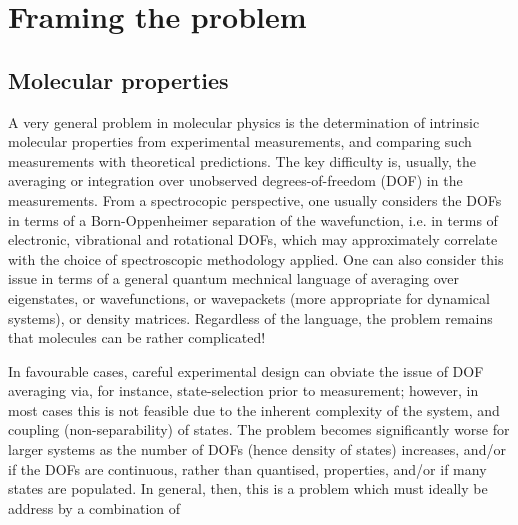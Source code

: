 \section{Framing the problem}

\subsection{Molecular properties}
A very general problem in molecular physics is the determination of intrinsic molecular properties from experimental measurements, and comparing such measurements with theoretical predictions. The key difficulty is, usually, the averaging or integration over unobserved degrees-of-freedom (DOF) in the measurements. From a spectrocopic perspective, one usually considers the DOFs in terms of a Born-Oppenheimer separation of the wavefunction, i.e. in terms of electronic, vibrational and rotational DOFs, which may approximately correlate with the choice of spectroscopic methodology applied. One can also consider this issue in terms of a general quantum mechnical language of averaging over eigenstates, or wavefunctions, or wavepackets (more appropriate for dynamical systems), or density matrices. Regardless of the language, the problem remains that molecules can be rather complicated!

In favourable cases, careful experimental design can obviate the issue of DOF averaging via, for instance, state-selection prior to measurement; however, in most cases this is not feasible due to the inherent complexity of the system, and coupling (non-separability) of states. The problem becomes significantly worse for larger systems as the number of DOFs (hence density of states) increases, and/or if the DOFs are continuous, rather than quantised, properties, and/or if many states are populated. In general, then, this is a problem which must ideally be address by a combination of 
